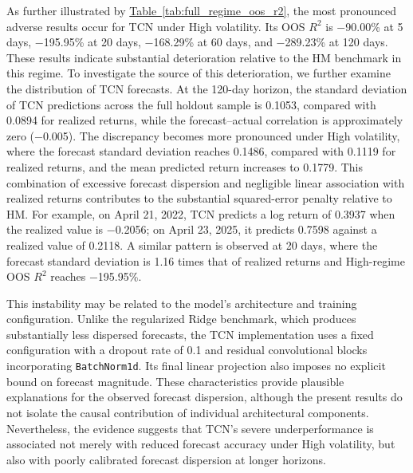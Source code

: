 \documentclass[12pt,twoside]{ord}
\begin{document}
As further illustrated by \hyperref[tab:full_regime_oos_r2]{Table~\ref*{tab:full_regime_oos_r2}}, the most pronounced adverse results occur for TCN under High volatility. Its OOS $R^2$ is $-$90.00\% at 5 days, $-$195.95\% at 20 days, $-$168.29\% at 60 days, and $-$289.23\% at 120 days. These results indicate substantial deterioration relative to the HM benchmark in this regime. To investigate the source of this deterioration, we further examine the distribution of TCN forecasts. At the 120-day horizon, the standard deviation of TCN predictions across the full holdout sample is 0.1053, compared with 0.0894 for realized returns, while the forecast--actual correlation is approximately zero ($-$0.005). The discrepancy becomes more pronounced under High volatility, where the forecast standard deviation reaches 0.1486, compared with 0.1119 for realized returns, and the mean predicted return increases to 0.1779. This combination of excessive forecast dispersion and negligible linear association with realized returns contributes to the substantial squared-error penalty relative to HM. For example, on April 21, 2022, TCN predicts a log return of 0.3937 when the realized value is $-$0.2056; on April 23, 2025, it predicts 0.7598 against a realized value of 0.2118. A similar pattern is observed at 20 days, where the forecast standard deviation is 1.16 times that of realized returns and High-regime OOS $R^2$ reaches $-$195.95\%.

This instability may be related to the model's architecture and training configuration. Unlike the regularized Ridge benchmark, which produces substantially less dispersed forecasts, the TCN implementation uses a fixed configuration with a dropout rate of 0.1 and residual convolutional blocks incorporating \texttt{BatchNorm1d}. Its final linear projection also imposes no explicit bound on forecast magnitude. These characteristics provide plausible explanations for the observed forecast dispersion, although the present results do not isolate the causal contribution of individual architectural components. Nevertheless, the evidence suggests that TCN's severe underperformance is associated not merely with reduced forecast accuracy under High volatility, but also with poorly calibrated forecast dispersion at longer horizons.
\end{document}
